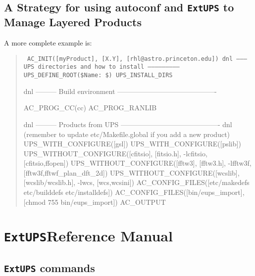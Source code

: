 \documentclass{article}
\newcommand{\code}[1]{\texttt{#1}}
\newcommand{\eups}{\code{ExtUPS}}
\begin{document}
\subsection{A Strategy for using autoconf and \eups{} to Manage Layered Products}


A more complete example is:

\begin{quote}
    \obeylines\tt\small\parskip=0pt
AC\_INIT([myProduct], [X.Y], [rhl@astro.princeton.edu])
\vspace{5pt}
dnl --------- UPS directories and how to install --------------------------
\vspace{5pt}
UPS\_DEFINE\_ROOT(\${Name}:  \$)
UPS\_INSTALL\_DIRS   
\vspace{5pt}

dnl --------- Build environment -------------------------------------------

AC\_PROG\_CC(cc)
AC\_PROG\_RANLIB

dnl --------- Products from UPS -------------------------------------------
dnl (remember to update etc/Makefile.global if you add a new product)
\vspace{5pt}
UPS\_WITH\_CONFIGURE([gsl])
UPS\_WITH\_CONFIGURE([pslib])
\vspace{5pt}
UPS\_WITHOUT\_CONFIGURE([cfitsio], [fitsio.h],
                        -lcfitsio, [cfitsio,ffopen])
UPS\_WITHOUT\_CONFIGURE([fftw3],   [fftw3.h],
                        -lfftw3f,  [fftw3f,fftwf\_plan\_dft\_2d])
UPS\_WITHOUT\_CONFIGURE([wcslib],  [wcslib/wcslib.h],
                        -lwcs,     [wcs,wcsini])
\vspace{5pt}
AC\_CONFIG\_FILES([etc/makedefs etc/builddefs etc/installdefs])
AC\_CONFIG\_FILES([bin/eups\_import], [chmod 755 bin/eups\_import])
\vspace{5pt}
AC\_OUTPUT
\end{quote}

\appendix

\section{\eups Reference Manual}

\subsection{\eups{} commands}
\end{document}
